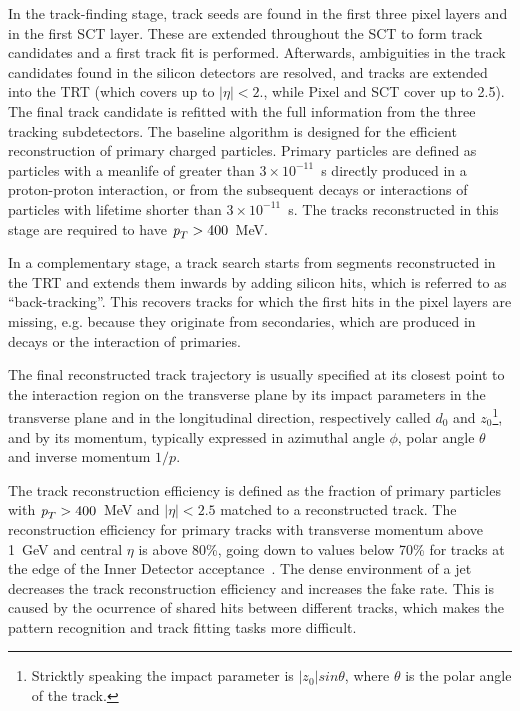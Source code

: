 In the track-finding stage, track seeds are found in the first three pixel layers and in the first SCT layer. These are extended throughout the SCT to form track candidates and a first track fit is performed. Afterwards, ambiguities in the track candidates found in the silicon detectors are resolved, and tracks are extended into the TRT (which covers up to $|\eta|<2.$, while Pixel and SCT cover up to 2.5). The final track candidate is refitted with the full information from the three tracking subdetectors. The baseline algorithm is designed for the efficient reconstruction of primary charged particles. Primary particles are defined as particles with a meanlife of greater than $3 \times 10^{-11}$~s directly produced in a proton-proton interaction, or from the subsequent decays or interactions of particles with lifetime shorter than $3 \times 10^{-11}$~s. The tracks reconstructed in this stage are required to have ${\emph{p}_{T}}> 400$~MeV.

In a complementary stage, a track search starts from segments reconstructed in the TRT and extends them inwards by adding silicon hits, which is referred to as ``back-tracking''. This recovers tracks for which the first hits in the pixel layers are missing, e.g. because they originate from secondaries, which are produced in decays or the interaction of primaries.

The final reconstructed track trajectory is usually specified at its closest point to the interaction region on the transverse plane by its impact parameters in the transverse plane and in the longitudinal direction, respectively called $d_0$ and $z_0$\footnote{Stricktly speaking the impact parameter is $|z_0|sin\theta$, where $\theta$ is the polar angle of the track.}, and by its momentum, typically expressed in azimuthal angle $\phi$, polar angle $\theta$ and inverse momentum $1/p$. 

 The track reconstruction efficiency is defined as the fraction of primary particles with ${\emph{p}_{T}}> 400$~MeV and $|\eta|<2.5$ matched to a reconstructed track. The reconstruction efficiency for primary tracks with transverse momentum above 1~GeV and central $\eta$ is above 80\%, going down to values below 70\% for tracks at the edge of the Inner Detector acceptance~\cite{chargemultiplicity}. %
The dense environment of a jet decreases the track reconstruction efficiency and increases the fake rate. This is caused by the ocurrence of shared hits between different tracks, which makes the pattern recognition and track fitting tasks more difficult.

